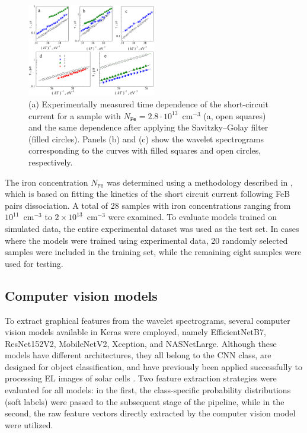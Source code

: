 \documentclass[10pt]{iopart}
\begin{document}
\begin{figure}
\includegraphics[width=0.5\textwidth]{Fig3}
\caption{\label{Fig3}
(a) Experimentally measured time dependence of the short-circuit current for a sample with
$N_\mathtt{Fe}=2.8\cdot10^{13}$~cm$^{-3}$ (a, open  squares) and the same dependence after applying the Savitzky–Golay filter (filled circles).
Panels (b) and (c) show the wavelet spectrograms corresponding to the curves with filled squares and open circles, respectively.
}%
\end{figure}

The iron concentration $N_\mathtt{Fe}$ was determined using a methodology described in \cite{Olikh2022:JMatSci,Olikh2021JAP}, 
which is based on fitting the kinetics of the short circuit current following FeB pairs dissociation.
A total of 28 samples with iron concentrations ranging from $10^{11}$~cm$^{-3}$ to $2\times10^{13}$~cm$^{-3}$ were examined.
To evaluate models trained on simulated data, the entire experimental dataset was used as the test set.
In cases where the models were trained using experimental data, 20 randomly selected samples were included in the training set, 
while the remaining eight samples were used for testing.



\subsection{Computer vision models}\label{subsec:CompVisMod}

To extract graphical features from the wavelet spectrograms, several computer vision models available in Keras were employed, 
namely EfficientNetB7, ResNet152V2, MobileNetV2, Xception, and NASNetLarge.
Although these models have different architectures, they all belong to the CNN class, are designed for object classification, 
and have previously been applied successfully to processing EL images of solar cells \cite{Jia2024, Otamendi2021, Chen2022, Abdelsattar2025, tella2025}.
Two feature extraction strategies were evaluated for all models: 
in the first, the class-specific probability distributions (soft labels) were passed to the subsequent stage of the pipeline, 
while in the second, the raw feature vectors directly extracted by the computer vision model were utilized.
\end{document}
